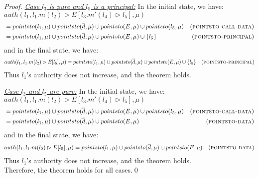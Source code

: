 \documentclass{llncs}
\begin{document}
\begin{proof}
\noindent\underline{\textit{Case $l_3$ is pure and $l_5$ is a principal:}}
In the initial state, we have:\\
\noindent$auth(l_1, l_1.m(l_2) \rhd E[l_3.m'(l_4) \rhd l_5], \mu)$
\vspace{-7pt}
\begin{align*}
&= pointsto(l_1, \mu) \cup pointsto(\overline{d}, \mu) \cup pointsto(E, \mu) \cup pointsto(l_5, \mu) & (\textsc{pointsto-call-data})\\
&= pointsto(l_1, \mu) \cup pointsto(\overline{d}, \mu) \cup pointsto(E, \mu) \cup \{ l_5 \} & (\textsc{pointsto-principal})
\end{align*}
and in the final state, we have:
\begin{align*}
auth(l_1, l_1.m(l_2) \rhd E[l_5], \mu) &= pointsto(l_1, \mu) \cup pointsto(\overline{d}, \mu) \cup pointsto(E, \mu) \cup \{ l_5 \} & (\textsc{pointsto-principal})
\end{align*}
Thus $l_1$'s authority does not increase, and the theorem holds.

\noindent\underline{\textit{Case $l_3$ and $l_5$ are pure:}}
In the initial state, we have:\\
\noindent$auth(l_1, l_1.m(l_2) \rhd E[l_3.m'(l_4) \rhd l_5], \mu)$
\vspace{-7pt}
\begin{align*}
&= pointsto(l_1, \mu) \cup pointsto(\overline{d}, \mu) \cup pointsto(E, \mu) \cup pointsto(l_5, \mu) & (\textsc{pointsto-call-data})\\
&= pointsto(l_1, \mu) \cup pointsto(\overline{d}, \mu) \cup pointsto(E, \mu) & (\textsc{pointsto-data})
\end{align*}
and in the final state, we have:
\begin{align*}
auth(l_1, l_1.m(l_2) \rhd E[l_5], \mu) &= pointsto(l_1, \mu) \cup pointsto(\overline{d}, \mu) \cup pointsto(E, \mu) & (\textsc{pointsto-data})
\end{align*}
Thus $l_1$'s authority does not increase, and the theorem holds.\\

\noindent Therefore, the theorem holds for all cases.\qed

\end{proof}

\newpage
\end{document}
